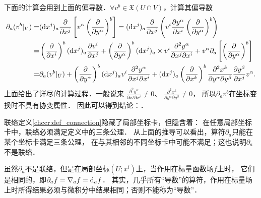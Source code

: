 下面的计算会用到上面的偏导数．$\forall v^b \in \mathfrak{X}(U\cap V)$，计算其偏导数
    \begin{align*}
        \partial_a (v^b|_V ) =&    ({\rm d }x^j)_a\frac{\partial }{\partial x^j} \left[v^\alpha
        \left(\frac{\partial }{\partial y^\alpha}\right) ^b \right]
        = ({\rm d }x^j)_a \frac{\partial }{\partial x^j}
        \left(v^i \frac{\partial y^\alpha}{\partial x^i}\left(\frac{\partial }{\partial y^\alpha}\right) ^b\right) \\
        =& \left(\frac{\partial }{\partial x^i}\right) ^b ({\rm d }x^j)_a
        \frac{\partial v^i}{\partial x^j}
        +\left(\frac{\partial }{\partial y^\alpha}\right) ^b ({\rm d }x^j)_a
        \times v^i \frac{\partial^2 y^\alpha}{\partial x^j\partial x^i} 
        +v^\alpha \partial_a \left[ \left(\frac{\partial }{\partial y^\alpha}\right) ^b \right] \\
        =& \partial_a (v^b|_U ) +\left(\frac{\partial }{\partial y^\alpha}\right) ^b ({\rm d }x^j)_a
        v^i \frac{\partial^2 y^\alpha}{\partial x^j\partial x^i}
        +({\rm d }x^j)_a \left(\frac{\partial }{\partial x^k}\right) ^b 
        \frac{\partial^2 x^k}{\partial y^\alpha\partial y^\beta}
        \frac{\partial y^\beta}{\partial x^j} v^\alpha  .
    \end{align*}
上面给出了详尽的计算过程．一般说来
$\frac{\partial^2 y^\alpha}{\partial x^j\partial x^i}\neq 0$、
$\frac{\partial^2 x^k}{\partial y^\alpha\partial y^\beta}\neq 0$，
所以$\partial_a v^b$在坐标变换时不具有协变属性．
因此可以得到结论：．




联络定义\ref{chccr:def_connection}隐藏了局部坐标卡，但隐含着：
在任意局部坐标卡中，联络必须满足定义中的三条公理．
从上面的推导可以看出，算符$\partial_a$只能在某个坐标卡满足三条公理，
在与其相邻的不同坐标卡中可能不满足；这也说明$\partial_a$不是联络．


虽然$\partial_a$不是联络，但是在局部坐标$(U;x^i)$上，当作用在标量函数场$f$上时，
它们是相同的，即$\partial_a f = \nabla_a f = {\rm d}_a f$．
其实，几乎所有“导数”的算符，作用在标量场上时所得结果必须与微积分中结果相同；否则不能称为“导数”．

